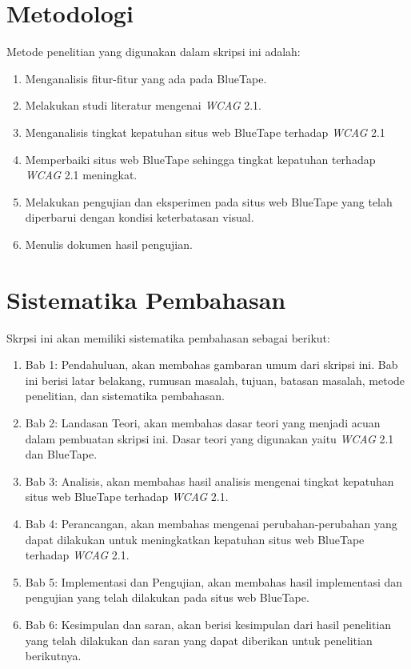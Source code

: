 \section{Metodologi}
\label{sec:metlit}
Metode penelitian yang digunakan dalam skripsi ini adalah:
\begin{enumerate}
	\item Menganalisis fitur-fitur yang ada pada BlueTape.
	\item Melakukan studi literatur mengenai \textit{WCAG} 2.1.
	\item Menganalisis tingkat kepatuhan situs web BlueTape terhadap \textit{WCAG} 2.1
	\item Memperbaiki situs web BlueTape sehingga tingkat kepatuhan terhadap \textit{WCAG} 2.1 meningkat.
	\item Melakukan pengujian dan eksperimen pada situs web BlueTape yang telah diperbarui dengan kondisi keterbatasan visual.
	\item Menulis dokumen hasil pengujian.
\end{enumerate}

\section{Sistematika Pembahasan}
\label{sec:sispem}
Skrpsi ini akan memiliki sistematika pembahasan sebagai berikut: 
\begin{enumerate}
	\item Bab 1: Pendahuluan, akan membahas gambaran umum dari skripsi ini. Bab ini berisi latar belakang, rumusan masalah, tujuan, batasan masalah, metode penelitian, dan sistematika pembahasan.
	\item Bab 2: Landasan Teori, akan membahas dasar teori yang menjadi acuan dalam pembuatan skripsi ini. Dasar teori yang digunakan yaitu \textit{WCAG} 2.1 dan BlueTape.
	\item Bab 3: Analisis, akan membahas hasil analisis mengenai tingkat kepatuhan situs web BlueTape terhadap \textit{WCAG} 2.1.
	\item Bab 4: Perancangan, akan membahas mengenai perubahan-perubahan yang dapat dilakukan untuk meningkatkan kepatuhan situs web BlueTape terhadap \textit{WCAG} 2.1.
	\item Bab 5: Implementasi dan Pengujian, akan membahas hasil implementasi dan pengujian yang telah dilakukan pada situs web BlueTape.
	\item Bab 6: Kesimpulan dan saran, akan berisi kesimpulan dari hasil penelitian yang telah dilakukan dan saran yang dapat diberikan untuk penelitian berikutnya.
\end{enumerate}